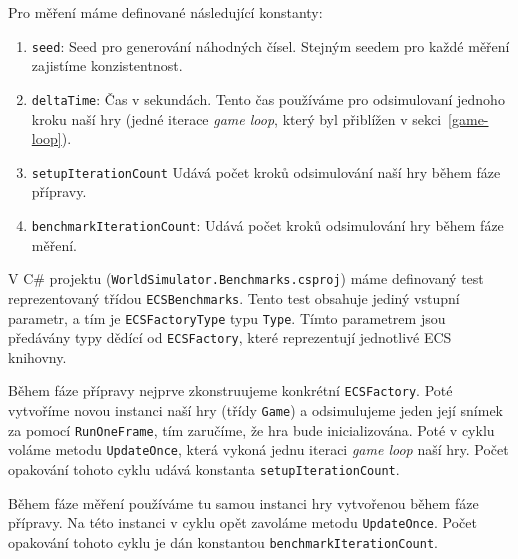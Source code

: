 Pro měření máme definované následující konstanty:

\begin{enumerate}
  \item \texttt{seed}: Seed pro generování náhodných čísel. Stejným seedem pro každé měření zajistíme konzistentnost.

  \item \texttt{deltaTime}: Čas v sekundách. Tento čas používáme pro odsimulovaní jednoho kroku naší hry (jedné iterace \textit{game loop}, který byl přiblížen v sekci~\ref{game-loop}).

  \item \texttt{setupIterationCount} Udává počet kroků odsimulování naší hry během fáze přípravy.

  \item \texttt{benchmarkIterationCount}: Udává počet kroků odsimulování hry během fáze měření.
\end{enumerate}

V C\# projektu (\texttt{WorldSimulator.Benchmarks.csproj}) máme definovaný test reprezentovaný třídou \texttt{ECSBenchmarks}. Tento test obsahuje jediný vstupní parametr, a tím je \texttt{ECSFactoryType} typu \texttt{Type}. Tímto parametrem jsou předávány typy dědící od \texttt{ECSFactory}, které reprezentují jednotlivé ECS knihovny.

Během fáze přípravy nejprve zkonstruujeme konkrétní \texttt{ECSFactory}. Poté vytvoříme novou instanci naší hry (třídy \texttt{Game}) a odsimulujeme jeden její snímek za pomocí \texttt{RunOneFrame}, tím zaručíme, že hra bude inicializována. Poté v cyklu voláme metodu \texttt{UpdateOnce}, která vykoná jednu iteraci \textit{game loop} naší hry. Počet opakování tohoto cyklu udává konstanta \texttt{setupIterationCount}.

Během fáze měření používáme tu samou instanci hry vytvořenou během fáze přípravy. Na této instanci v cyklu opět zavoláme metodu \texttt{UpdateOnce}. Počet opakování tohoto cyklu je dán konstantou \texttt{benchmarkIterationCount}.












